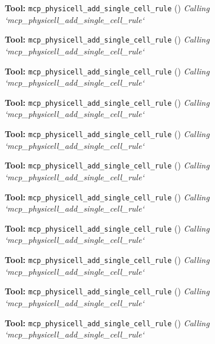 \documentclass[11pt,a4paper]{article}
\begin{document}
\begin{toolokbox}
\textbf{Tool:} \texttt{mcp\_physicell\_add\_single\_cell\_rule} (\checkmark)
\textit{Calling `mcp\_physicell\_add\_single\_cell\_rule`}
\end{toolokbox}
\begin{toolokbox}
\textbf{Tool:} \texttt{mcp\_physicell\_add\_single\_cell\_rule} (\checkmark)
\textit{Calling `mcp\_physicell\_add\_single\_cell\_rule`}
\end{toolokbox}
\begin{toolokbox}
\textbf{Tool:} \texttt{mcp\_physicell\_add\_single\_cell\_rule} (\checkmark)
\textit{Calling `mcp\_physicell\_add\_single\_cell\_rule`}
\end{toolokbox}
\begin{toolokbox}
\textbf{Tool:} \texttt{mcp\_physicell\_add\_single\_cell\_rule} (\checkmark)
\textit{Calling `mcp\_physicell\_add\_single\_cell\_rule`}
\end{toolokbox}
\begin{toolokbox}
\textbf{Tool:} \texttt{mcp\_physicell\_add\_single\_cell\_rule} (\checkmark)
\textit{Calling `mcp\_physicell\_add\_single\_cell\_rule`}
\end{toolokbox}
\begin{toolokbox}
\textbf{Tool:} \texttt{mcp\_physicell\_add\_single\_cell\_rule} (\checkmark)
\textit{Calling `mcp\_physicell\_add\_single\_cell\_rule`}
\end{toolokbox}
\begin{toolokbox}
\textbf{Tool:} \texttt{mcp\_physicell\_add\_single\_cell\_rule} (\checkmark)
\textit{Calling `mcp\_physicell\_add\_single\_cell\_rule`}
\end{toolokbox}
\begin{toolokbox}
\textbf{Tool:} \texttt{mcp\_physicell\_add\_single\_cell\_rule} (\checkmark)
\textit{Calling `mcp\_physicell\_add\_single\_cell\_rule`}
\end{toolokbox}
\begin{toolokbox}
\textbf{Tool:} \texttt{mcp\_physicell\_add\_single\_cell\_rule} (\checkmark)
\textit{Calling `mcp\_physicell\_add\_single\_cell\_rule`}
\end{toolokbox}
\begin{toolokbox}
\textbf{Tool:} \texttt{mcp\_physicell\_add\_single\_cell\_rule} (\checkmark)
\textit{Calling `mcp\_physicell\_add\_single\_cell\_rule`}
\end{toolokbox}
\begin{toolokbox}
\textbf{Tool:} \texttt{mcp\_physicell\_add\_single\_cell\_rule} (\checkmark)
\textit{Calling `mcp\_physicell\_add\_single\_cell\_rule`}
\end{toolokbox}
\end{document}
